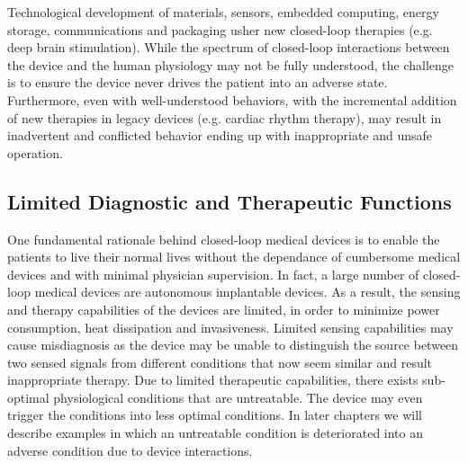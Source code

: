 Technological development of materials, sensors, embedded computing, energy storage, communications and packaging usher new closed-loop therapies (e.g. deep brain stimulation). While the spectrum of closed-loop interactions between the device and the human physiology may not be fully understood, the challenge is to ensure the device never drives the patient into an adverse state. Furthermore, even with well-understood behaviors, with the incremental addition of new therapies in legacy devices (e.g. cardiac rhythm therapy), may result in inadvertent and conflicted behavior ending up with inappropriate and unsafe operation. 

\subsection{Limited Diagnostic and Therapeutic Functions}
One fundamental rationale behind closed-loop medical devices is to enable the patients to live their normal lives without the dependance of cumbersome medical devices and with minimal physician supervision. In fact, a large number of closed-loop medical devices are autonomous implantable devices. As a result, the sensing and therapy capabilities of the devices are limited, in order to minimize power consumption, heat dissipation and invasiveness. Limited sensing capabilities may cause misdiagnosis as the device may be unable to distinguish the source between two sensed signals from different conditions that now seem similar and result inappropriate therapy. Due to limited therapeutic capabilities, there exists sub-optimal physiological conditions that are untreatable. The device may even trigger the conditions into less optimal conditions. In later chapters we will describe examples in which an untreatable condition is deteriorated into an adverse condition due to device interactions.

